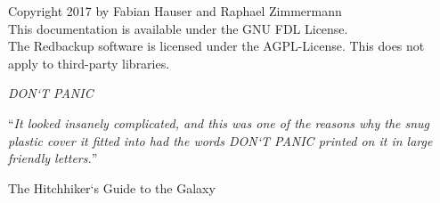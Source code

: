 \vspace*{\fill}

\noindent \textcopyright  Copyright 2017 by Fabian Hauser and Raphael Zimmermann\\

\noindent This documentation is available under the GNU FDL License. \\

\noindent The Redbackup software is licensed under the AGPL-License. This does not apply to third-party libraries.

\pagebreak


\vspace*{0.1\textheight}

{\noindent\huge\textit{DON`T PANIC}\par\vspace{10pt}}

\noindent\enquote{\itshape It looked insanely complicated, and this was one of the reasons why the snug plastic cover it fitted into had the words DON`T PANIC printed on it in large friendly letters.}\bigbreak

\hfill The Hitchhiker`s Guide to the Galaxy


